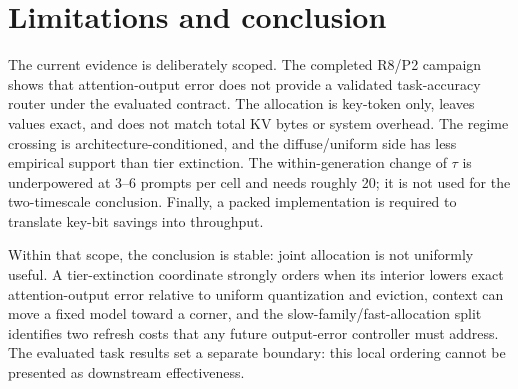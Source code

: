 \documentclass{article}
\theoremstyle{definition}
\begin{document}
\section{Limitations and conclusion}

The current evidence is deliberately scoped.  The completed R8/P2 campaign shows that attention-output error does not provide a validated task-accuracy router under the evaluated contract.  The allocation is key-token only, leaves values exact, and does not match total KV bytes or system overhead.  The regime crossing is architecture-conditioned, and the diffuse/uniform side has less empirical support than tier extinction.  The within-generation change of $\tau$ is underpowered at 3--6 prompts per cell and needs roughly 20; it is not used for the two-timescale conclusion.  Finally, a packed implementation is required to translate key-bit savings into throughput.

Within that scope, the conclusion is stable: joint allocation is not uniformly useful.  A tier-extinction coordinate strongly orders when its interior lowers exact attention-output error relative to uniform quantization and eviction, context can move a fixed model toward a corner, and the slow-family/fast-allocation split identifies two refresh costs that any future output-error controller must address.  The evaluated task results set a separate boundary: this local ordering cannot be presented as downstream effectiveness.

\label{main:end}



\clearpage
\appendix

\end{document}
